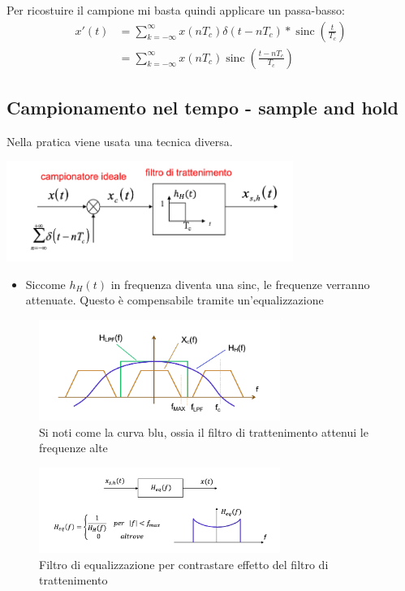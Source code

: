 Per ricostuire il campione mi basta quindi applicare un passa-basso:
\begin{align*}
	x'\left(t\right) & = \sum_{k=-\infty }^{\infty} x\left(nT_c\right)\delta \left(t - nT_c\right) * \operatorname{sinc} \left(\frac{t}{T_c}\right) \\
	                 & = \sum_{k=-\infty }^{\infty} x\left(nT_c\right) \operatorname{sinc} \left(\frac{t - nT_c}{T_c}\right)
\end{align*}

\subsection{Campionamento nel tempo - sample and hold}
Nella pratica viene usata una tecnica diversa.
\begin{center}
	\includegraphics[width = 0.7\textwidth]{Images/Sample and hold.png }
\end{center}
\begin{itemize}
	\item Siccome $ h_H\left(t\right) $ in frequenza diventa una sinc, le frequenze verranno attenuate. Questo è compensabile tramite un'equalizzazione
\end{itemize}
\begin{figure}[H]
	\begin{center}
		\includegraphics[width = 0.7\textwidth]{Images/Sample and hold 2.png}
	\end{center}
	\caption{Si noti come la curva blu, ossia il filtro di trattenimento attenui le frequenze alte}
\end{figure}
\begin{figure}[H]
	\begin{center}
		\includegraphics[width = 0.7\textwidth]{Images/Sample and hold 3.png}
	\end{center}
	\caption{Filtro di equalizzazione per contrastare effetto del filtro di trattenimento}
\end{figure}
